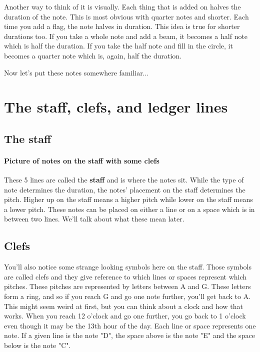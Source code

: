 \documentclass[../OpenAppliedMusicTheory.tex]{subfiles}
\begin{document}
        Another way to think of it is visually. Each thing that is added on halves the duration of the note. This is most obvious with quarter notes and shorter. Each time you add a flag, the note halves in duration. This idea is true for shorter durations too. If you take a whole note and add a beam, it becomes a half note which is half the duration. If you take the half note and fill in the circle, it becomes a quarter note which is, again, half the duration.


        Now let's put these notes somewhere familiar...

    \section{The staff, clefs, and ledger lines}\label{ch1:staff}
        \subsection{The staff}
        \paragraph{Picture of notes on the staff with some clefs}
        
        These 5 lines are called the \textbf{staff} and is where the notes sit. While the type of note determines the duration, the notes' placement on the staff determines the pitch. Higher up on the staff means a higher pitch while lower on the staff means a lower pitch. These notes can be placed on either a line or on a space which is in between two lines. We'll talk about what these mean later.

        \subsection{Clefs}
        You'll also notice some strange looking symbols here on the staff. Those symbols are called clefs and they give reference to which lines or spaces represent which pitches. These pitches are represented by letters between A and G. These letters form a ring, and so if you reach G and go one note further, you'll get back to A. This might seem weird at first, but you can think about a clock and how that works. When you reach 12 o'clock and go one further, you go back to 1 o'clock even though it may be the 13th hour of the day. Each line or space represents one note. If a given line is the note "D", the space above is the note "E" and the space below is the note "C".
\end{document}
